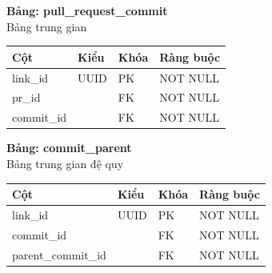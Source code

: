 \textbf{Bảng: pull\_request\_commit}\\
Bảng trung gian
\begin{table}[H]
\centering
\begin{tabular}{|l|l|l|l|}
\hline
\textbf{Cột} & \textbf{Kiểu} & \textbf{Khóa} & \textbf{Ràng buộc} \\ \hline
link\_id & UUID & PK & NOT NULL \\ \hline
pr\_id & & FK & NOT NULL \\ \hline
commit\_id & & FK & NOT NULL \\ \hline
\end{tabular}
\end{table}

\textbf{Bảng: commit\_parent}\\
Bảng trung gian đệ quy
\begin{table}[H]
\centering
\begin{tabular}{|l|l|l|l|}
\hline
\textbf{Cột} & \textbf{Kiểu} & \textbf{Khóa} & \textbf{Ràng buộc} \\ \hline
link\_id & UUID & PK & NOT NULL \\ \hline
commit\_id & & FK & NOT NULL \\ \hline
parent\_commit\_id & & FK & NOT NULL \\ \hline
\end{tabular}
\end{table}

